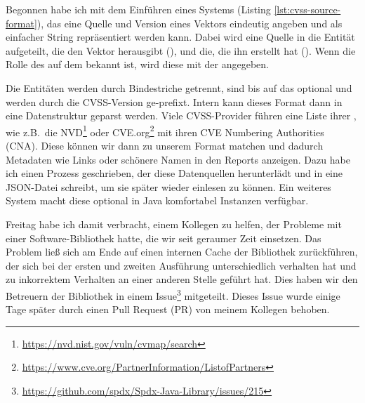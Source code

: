 Begonnen habe ich mit dem Einführen eines Systems (Listing \ref{lst:cvss-source-format}), das eine Quelle und Version eines Vektors eindeutig angeben und als einfacher String repräsentiert werden kann.
Dabei wird eine Quelle in die Entität aufgeteilt, die den Vektor herausgibt (), und die, die ihn erstellt hat ().
Wenn die Rolle des  auf dem  bekannt ist, wird diese mit der  angegeben.

Die Entitäten werden durch Bindestriche getrennt, sind bis auf das  optional und werden durch die CVSS-Version ge-prefixt.
Intern kann dieses Format dann in eine Datenstruktur geparst werden.
Viele CVSS-Provider führen eine Liste ihrer , wie z.B.\ die NVD\footnote{\url{https://nvd.nist.gov/vuln/cvmap/search}} oder CVE.org\footnote{\url{https://www.cve.org/PartnerInformation/ListofPartners}} mit ihren CVE Numbering Authorities (CNA).
Diese können wir dann zu unserem Format matchen und dadurch Metadaten wie Links oder schönere Namen in den Reports anzeigen.
Dazu habe ich einen Prozess geschrieben, der diese Datenquellen herunterlädt und in eine JSON-Datei schreibt, um sie später wieder einlesen zu können.
Ein weiteres System macht diese optional in Java komfortabel Instanzen verfügbar.

\sweekdaymarginpar{\weekdayFridayLong}

Freitag habe ich damit verbracht, einem Kollegen zu helfen, der Probleme mit einer Software-Bibliothek hatte, die wir seit geraumer Zeit einsetzen.
Das Problem ließ sich am Ende auf einen internen Cache der Bibliothek zurückführen, der sich bei der ersten und zweiten Ausführung unterschiedlich verhalten hat und zu inkorrektem Verhalten an einer anderen Stelle geführt hat.
Dies haben wir den Betreuern der Bibliothek in einem Issue\footnote{\url{https://github.com/spdx/Spdx-Java-Library/issues/215}} mitgeteilt.
Dieses Issue wurde einige Tage später durch einen Pull Request (PR) von meinem Kollegen behoben.
